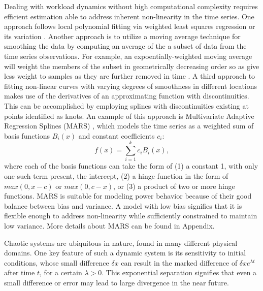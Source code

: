 \documentclass[acmtaco]{acmtrans2m}
\begin{document}
Dealing with workload dynamics without high computational complexity
requires efficient estimation able to address inherent non-linearity in
the time series.  One approach follows local polynomial fitting via
weighted least squares regression \cite{Fan1996} or its variation
\cite{Singh2009}.  Another approach is to utilize a moving average
technique for smoothing the data by computing an average of the a subset
of data from the time series observations.  For example, an
expoentially-weighted moving average will weight the members of the
subset in geometrically decreasing order so as give less weight to
samples as they are further removed in time \cite{NIST2010}. A third
approach to fitting non-linear curves with varying degrees of smoothness
in different locations makes use of the derivatives of an approximating
function with discontinuities.  This can be accomplished by employing
splines with discontinuities existing at points identified as knots.  An
example of this approach is Multivariate Adaptive Regression Splines
(MARS) \cite{Friedman1991}, which models the time series as a weighted
sum of basis functions $B_{i}(x)$ and constant coefficients $c_{i}$:
\begin{equation}
  \label{eq:mars}
  f(x)= \displaystyle\sum_{i=1}^{k}c_{i}B_{i}(x),
\end{equation}
where each of the basis functions can take the form of (1) a constant 1,
with only one such term present, the intercept, (2) a hinge function in
the form of $max(0,x - c)$ or $max(0, c - x)$, or (3) a product of two or
more hinge functions.   MARS is suitable for modeling power
behavior because of their good balance between bias and variance.
A model with low bias signifies that it is flexible enough to address
non-linearity while sufficiently constrained to maintain low variance.
More details about MARS can be found in Appendix.

Chaotic systems are ubiquitous in nature, found in many different
physical domains.  One key feature of such a
dynamic system is its sensitivity to initial conditions, whose small
difference $\delta{x}$ can result in the marked difference of
$\delta{x}e^{\lambda t}$ after time $t$, for a certain $\lambda > 0$.
This exponential separation signifies that even a small difference or
error may lead to large divergence in the near future.
\end{document}
